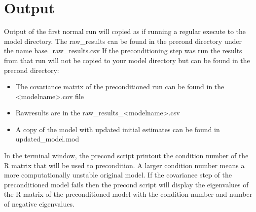 \section{Output}
Output of the first normal run will copied as if running a regular execute to the model directory. The raw\_results can be found
in the precond directory under the name base\_raw\_results.csv
If the preconditioning step was run the results from that run will not be copied to your model directory but can be found
in the precond directory:

\begin{itemize}
    \item The covariance matrix of the preconditioned run can be found in the <modelname>.cov file
    \item Rawresults are in the raw\_results\_<modelname>.csv
    \item A copy of the model with updated initial estimates can be found in updated\_model.mod
\end{itemize}
 

In the terminal window, the precond script printout the condition number of the R matrix that will be used to precondition.  A larger condition number means a more computationally unstable original model. If the covariance step of the preconditioned model fails then the precond script will display the eigenvalues of the R matrix of the preconditioned model with the condition number and number of negative eigenvalues.  

%
%
%
%

